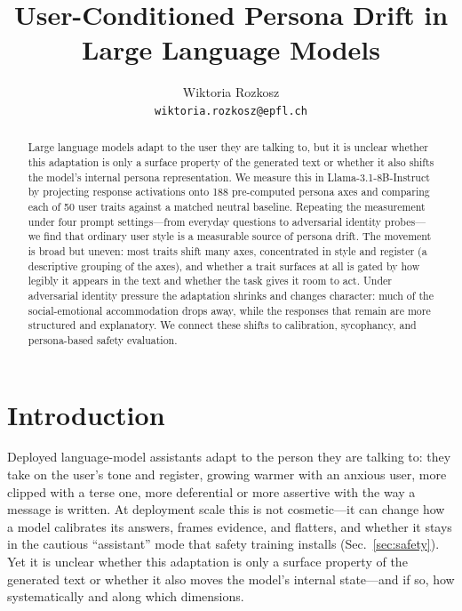 \documentclass{article}
\title{User-Conditioned Persona Drift in Large Language Models}
\author{%
  Wiktoria Rozkosz\\
  \texttt{wiktoria.rozkosz@epfl.ch}
}
\begin{document}
\maketitle

\begin{abstract}
Large language models adapt to the user they are talking to, but it is unclear whether this adaptation is only a surface property of the generated text or whether it also shifts the model's internal persona representation. We measure this in \mbox{Llama-3.1-8B-Instruct} by projecting response activations onto 188 pre-computed persona axes and comparing each of 50 user traits against a matched neutral baseline. Repeating the measurement under four prompt settings---from everyday questions to adversarial identity probes---we find that ordinary user style is a measurable source of persona drift. The movement is broad but uneven: most traits shift many axes, concentrated in style and register (a descriptive grouping of the axes), and whether a trait surfaces at all is gated by how legibly it appears in the text and whether the task gives it room to act. Under adversarial identity pressure the adaptation shrinks and changes character: much of the social-emotional accommodation drops away, while the responses that remain are more structured and explanatory. We connect these shifts to calibration, sycophancy, and persona-based safety evaluation.
\end{abstract}

\section{Introduction}
\label{sec:intro}

Deployed language-model assistants adapt to the person they are talking to: they take on the user's tone and register, growing warmer with an anxious user, more clipped with a terse one, more deferential or more assertive with the way a message is written. At deployment scale this is not cosmetic---it can change how a model calibrates its answers, frames evidence, and flatters, and whether it stays in the cautious ``assistant'' mode that safety training installs (Sec.~\ref{sec:safety}). Yet it is unclear whether this adaptation is only a surface property of the generated text or whether it also moves the model's internal state---and if so, how systematically and along which dimensions.
\end{document}
